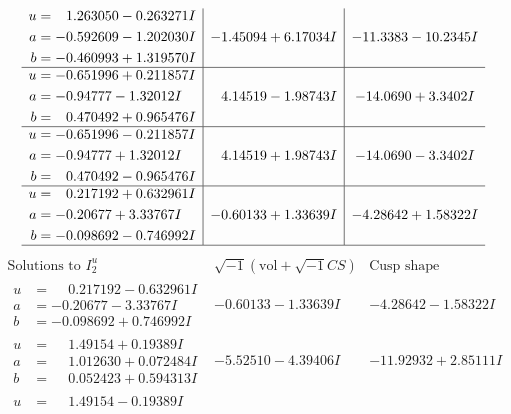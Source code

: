 \documentclass[1p]{elsarticle_modified}
\theoremstyle{definition}
\newcommand{\I}{\sqrt{-1}}
\begin{document}
$$\begin{array}{c|c|c}
\begin{aligned}
u &= \phantom{-}1.263050 - 0.263271 I \\
a &= -0.592609 - 1.202030 I \\
b &= -0.460993 + 1.319570 I\end{aligned}
 & -1.45094 + 6.17034 I & -11.3383 - 10.2345 I \\ \hline\begin{aligned}
u &= -0.651996 + 0.211857 I \\
a &= -0.94777 - 1.32012 I \\
b &= \phantom{-}0.470492 + 0.965476 I\end{aligned}
 & \phantom{-}4.14519 - 1.98743 I & -14.0690 + 3.3402 I \\ \hline\begin{aligned}
u &= -0.651996 - 0.211857 I \\
a &= -0.94777 + 1.32012 I \\
b &= \phantom{-}0.470492 - 0.965476 I\end{aligned}
 & \phantom{-}4.14519 + 1.98743 I & -14.0690 - 3.3402 I \\ \hline\begin{aligned}
u &= \phantom{-}0.217192 + 0.632961 I \\
a &= -0.20677 + 3.33767 I \\
b &= -0.098692 - 0.746992 I\end{aligned}
 & -0.60133 + 1.33639 I & -4.28642 + 1.58322 I\\
 \hline 
 \end{array}$$\newpage$$\begin{array}{c|c|c}  
\text{Solutions to }I^u_{2}& \I (\text{vol} + \sqrt{-1}CS) & \text{Cusp shape}\\
 \hline 
\begin{aligned}
u &= \phantom{-}0.217192 - 0.632961 I \\
a &= -0.20677 - 3.33767 I \\
b &= -0.098692 + 0.746992 I\end{aligned}
 & -0.60133 - 1.33639 I & -4.28642 - 1.58322 I \\ \hline\begin{aligned}
u &= \phantom{-}1.49154 + 0.19389 I \\
a &= \phantom{-}1.012630 + 0.072484 I \\
b &= \phantom{-}0.052423 + 0.594313 I\end{aligned}
 & -5.52510 - 4.39406 I & -11.92932 + 2.85111 I \\ \hline\begin{aligned}
u &= \phantom{-}1.49154 - 0.19389 I \\

\end{aligned}
\end{array}$$
\end{document}
